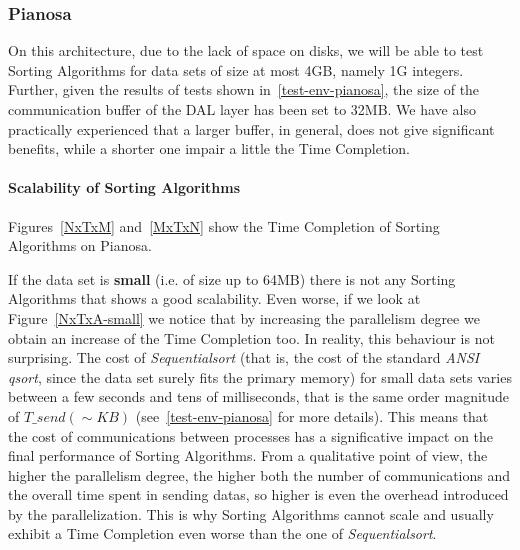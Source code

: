\subsubsection{Pianosa}
On this architecture, due to the lack of space on disks, we will be able to test Sorting Algorithms for data sets of size at most 4GB, namely 1G integers. Further, given the results of tests shown in~\ref{test-env-pianosa}, the size of the communication buffer of the DAL layer has been set to 32MB. We have also practically experienced that a larger buffer, in general, does not give significant benefits, while a shorter one impair a little the Time Completion.

\paragraph{Scalability of Sorting Algorithms}
Figures~\ref{NxTxM} and~\ref{MxTxN} show the Time Completion of Sorting Algorithms on Pianosa.

If the data set is \textbf{small} (i.e. of size up to 64MB) there is not any Sorting Algorithms that shows a good scalability. Even worse, if we look at Figure~\ref{NxTxA-small} we notice that by increasing the parallelism degree we obtain an increase of the Time Completion too. In reality, this behaviour is not surprising. The cost of \textit{Sequentialsort} (that is, the cost of the standard \textit{ANSI qsort}, since the data set surely fits the primary memory) for small data sets varies between a few seconds and tens of milliseconds, that is the same order magnitude of $T\_send( \sim KB )$ (see~\ref{test-env-pianosa} for more details). This means that the cost of communications between processes has a significative impact on the final performance of Sorting Algorithms. From a qualitative point of view, the higher the parallelism degree, the higher both the number of communications and the overall time spent in sending datas, so higher is even the overhead introduced by the parallelization. This is why Sorting Algorithms cannot scale and usually exhibit a Time Completion even worse than the one of \textit{Sequentialsort}.

